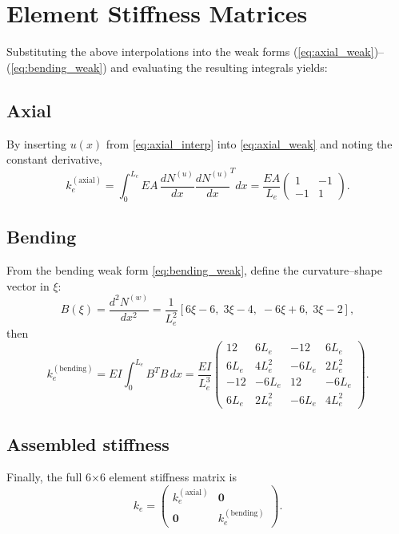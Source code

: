 \documentclass{article}
\begin{document}
	\section{Element Stiffness Matrices}
	Substituting the above interpolations into the weak forms (\ref{eq:axial_weak})–(\ref{eq:bending_weak}) and evaluating the resulting integrals yields:
	
	\subsection{Axial}
	By inserting \(u(x)\) from \eqref{eq:axial_interp} into \eqref{eq:axial_weak} and noting the constant derivative,
	\begin{equation}\label{eq:ke_axial}
		k_e^{(\mathrm{axial})}
		= \int_0^{L_e}EA\,\frac{dN^{(u)}}{dx}\frac{dN^{(u)}}{dx}^Tdx
		= \frac{EA}{L_e}
		\begin{pmatrix}1 & -1\\ -1 & 1\end{pmatrix}.
	\end{equation}
	
	\subsection{Bending}
	From the bending weak form \eqref{eq:bending_weak}, define the curvature–shape vector in \(\xi\):
	\begin{equation}\label{eq:B_vector}
		B(\xi)
		= \frac{d^2N^{(w)}}{dx^2}
		= \frac{1}{L_e^2}[6\xi-6,\;3\xi-4,\;-6\xi+6,\;3\xi-2],
	\end{equation}
	then
	\begin{equation}\label{eq:ke_bending}
		k_e^{(\mathrm{bending})}
		= EI\int_0^{L_e}B^T B\,dx
		= \frac{EI}{L_e^3}
		\begin{pmatrix}
			12 & 6L_e & -12 & 6L_e\\
			6L_e & 4L_e^2 & -6L_e & 2L_e^2\\
			-12 & -6L_e & 12 & -6L_e\\
			6L_e & 2L_e^2 & -6L_e & 4L_e^2
		\end{pmatrix}.
	\end{equation}
	
	\subsection{Assembled stiffness}
	Finally, the full 6×6 element stiffness matrix is
	\begin{equation}\label{eq:ke_assembled}
		k_e
		= \begin{pmatrix}
			k_e^{(\mathrm{axial})} & \mathbf{0}\\
			\mathbf{0}            & k_e^{(\mathrm{bending})}
		\end{pmatrix}.
	\end{equation}
	
\end{document}
